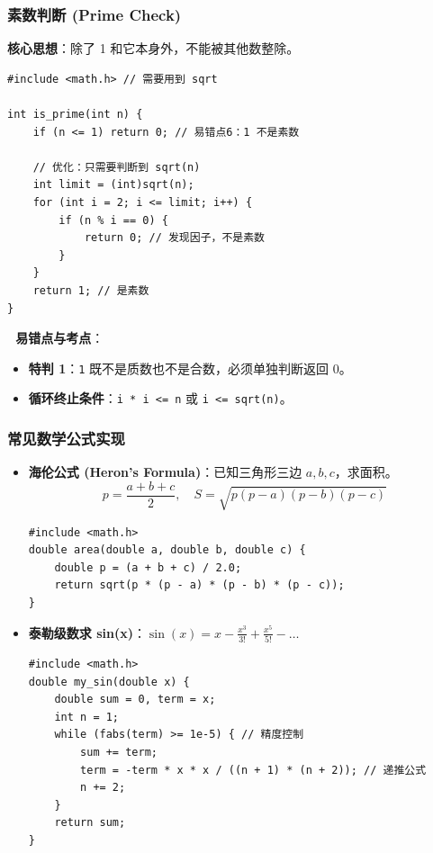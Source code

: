 \documentclass[a4paper,12pt]{article}
\begin{document}
\subsubsection{素数判断 (Prime Check)}
\textbf{核心思想}：除了 1 和它本身外，不能被其他数整除。

\begin{lstlisting}
#include <math.h> // 需要用到 sqrt

int is_prime(int n) {
    if (n <= 1) return 0; // 易错点6：1 不是素数
    
    // 优化：只需要判断到 sqrt(n)
    int limit = (int)sqrt(n);
    for (int i = 2; i <= limit; i++) {
        if (n % i == 0) {
            return 0; // 发现因子，不是素数
        }
    }
    return 1; // 是素数
}
\end{lstlisting}

\textbf{🔴 易错点与考点}：
\begin{itemize}
    \item \textbf{特判 1}：\texttt{1} 既不是质数也不是合数，必须单独判断返回 0。
    \item \textbf{循环终止条件}：\texttt{i * i <= n} 或 \texttt{i <= sqrt(n)}。
\end{itemize}

\subsubsection{常见数学公式实现}
\label{sec:math_formulas}
\begin{itemize}
    \item \textbf{海伦公式 (Heron's Formula)}：已知三角形三边 $a, b, c$，求面积。
    \[ p = \frac{a+b+c}{2}, \quad S = \sqrt{p(p-a)(p-b)(p-c)} \]
    \begin{lstlisting}
#include <math.h>
double area(double a, double b, double c) {
    double p = (a + b + c) / 2.0;
    return sqrt(p * (p - a) * (p - b) * (p - c));
}
    \end{lstlisting}
    \item \textbf{泰勒级数求 sin(x)}：$\sin(x) = x - \frac{x^3}{3!} + \frac{x^5}{5!} - \dots$
    \begin{lstlisting}
#include <math.h>
double my_sin(double x) {
    double sum = 0, term = x;
    int n = 1;
    while (fabs(term) >= 1e-5) { // 精度控制
        sum += term;
        term = -term * x * x / ((n + 1) * (n + 2)); // 递推公式
        n += 2;
    }
    return sum;
}
    \end{lstlisting}
\end{itemize}
\end{document}
